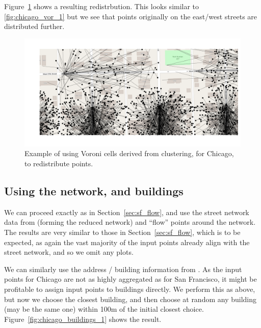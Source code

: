 \documentclass[twoside,a4paper,twocolumn,10pt]{article}
\theoremstyle{plain}
\theoremstyle{definition}
\begin{document}
Figure~\ref{fig:chicago_vor_4} shows a resulting redistrbution.  This looks similar to
\ref{fig:chicago_vor_1} but we see that points originally on the east/west streets are
distributed further.

\begin{figure}
  \includegraphics[width=\textwidth]{chicago_redist_cluster.png}
  \caption{Example of using Voroni cells derived from clustering, for Chicago, to redistribute points.}
  \label{fig:chicago_vor_4}
\end{figure}


\subsection{Using the network, and buildings}

We can proceed exactly as in Section~\ref{sec:sf_flow}, and use the street network data
from \cite{tiger} (forming the reduced network) and ``flow'' points around the network.
The results are very similar to those in Section~\ref{sec:sf_flow}, which is to be expected,
as again the vast majority of the input points already align with the street network, and
so we omit any plots.

We can similarly use the address / building information from \cite{oa}.  As the input points
for Chicago are not as highly aggregated as for San Francisco, it might be profitable to
assign input points to buildings directly.  We perform this as above, but now we choose the
closest building, and then choose at random any building (may be the same one) within 100m
of the initial closest choice.  Figure~\ref{fig:chicago_buildings_1} shows the result.
\end{document}
